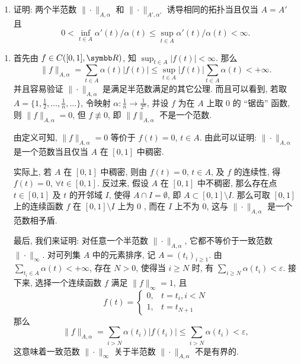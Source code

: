 \begin{enumerate}
\begin{enumerate}
      \item 证明: 两个半范数 $\|\cdot\|_{A, \alpha}$ 和 $\|\cdot\|_{A',\alpha'}$ 诱导相同的拓扑当且仅当 $A=A'$ 且
      \[
      0<\inf_{t\in A} \alpha'(t)/\alpha(t)\leqslant \sup_{t\in A} \alpha'(t)/\alpha(t)<\infty.
      \]
    \end{enumerate}
    \begin{answer}
      \begin{enumerate}
        \item 首先由 $f \in C([0,1], \R)$, 知 $\sup_{t \in A}|f(t)|<\infty$. 那么
        \[\|f\|_{A,\alpha}=\sum_{t\in A}\alpha(t)|f(t)|\leq\sup_{t\in A}|f(t)|\sum_{t \in A} \alpha(t)<+\infty.\]
        并且容易验证 $\|\cdot\|_{A, \alpha}$ 是满足半范数满足的其它公理. 
        而且可以看到, 若取 $A=\{1,\frac{1}{2},\ldots,\frac{1}{n},\ldots\}$, 
        令映射 $\alpha: \frac{1}{n} \rightarrow \frac{1}{2^{n}}$, 
        并设 $f$ 为在 $A$ 上取 $0$ 的 “锯齿” 函数, 则 $\|f\|_{A,\alpha}=0$, 但 $f\not\equiv 0$, 即 $\|f\|_{A,\alpha}$ 不是一个范数.
    
        由定义可知, $\|f\|_{A, \alpha}=0$ 等价于 $f(t)=0$, $t\in A$. 由此可以证明: $\|\cdot\|_{A, \alpha}$ 
        是一个范数当且仅当 $A$ 在 $[0,1]$ 中稠密.
    
        实际上, 若 $A$ 在 $[0,1]$ 中稠密, 则由 $f(t)=0$, $t\in A$, 及 $f$ 的连续性, 得 $f(t)=0$, $\forall t \in[0,1]$. 
        反过来, 假设 $A$ 在 $[0,1]$ 中不稠密, 那么存在点 $t\in[0,1]$
        及 $t$ 的开邻域 $I$, 使得 $A\cap I=\emptyset$, 即 $A \subset[0,1]\setminus I$.
        那么可取 $[0,1]$ 上的连续函数 $f$ 在 $[0,1]\setminus I$ 上为 $0$ , 而在 $I$ 上不为 $0$, 
        这与 $\|\cdot\|_{A,\alpha}$ 是一个范数相予盾.
    
        最后, 我们来证明: 对任意一个半范数 $\|\cdot\|_{A,\alpha}$, 它都不等价于一致范数 $\|\cdot\|_{\infty}$.
        对可列集 $A$ 中的元素排序, 记 $A=(t_{i})_{i\geq 1}$. 
        由 $\sum_{t_i\in A} \alpha(t)<+\infty$, 存在 $N>0$, 使得当 $i\geq N$ 时, 
        有 $\sum_{i \geq N} \alpha(t_i)<\varepsilon$. 接下来, 选择一个连续函数 $f$ 满足 $\|f\|_{\infty}=1$, 且
        \[
        f(t)= \begin{cases}0, & t=t_{i}, i<N \\ 1, & t=t_{N+1}\end{cases}
        \]
        那么
        \[
        \|f\|_{A,\alpha}=\sum_{i>N} \alpha(t_i)|f(t_i)|\leq\sum_{i>N} \alpha(t_i)<\varepsilon,
        \]
        这意味着一致范数 $\|\cdot\|_{\infty}$ 关于半范数 $\|\cdot\|_{A,\alpha}$ 不是有界的.
    

\end{enumerate}
\end{answer}
\end{enumerate}
